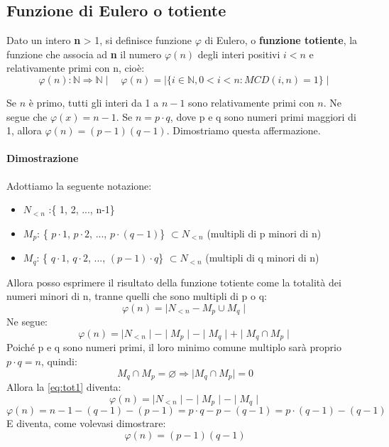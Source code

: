 \subsection{Funzione di Eulero o totiente}  

Dato un intero \textbf{n} > 1, si definisce funzione $\varphi$ di Eulero, o \textbf{funzione totiente}, la funzione che associa ad \textbf{n} il numero $\varphi (n)$ degli interi positivi $i < n$ e relativamente
primi con n, cioè:
\begin{equation}
\varphi (n): \mathbb{N} \Rightarrow \mathbb{N} \mid \quad \varphi (n) = \mid \{ i \in \mathbb{N}, 0 < i < n: MCD(i,n) = 1 \} \mid
\end{equation}

Se $n$ è primo, tutti gli interi da 1 a $n-1$ sono relativamente primi con $n$. Ne segue che $\varphi(x) = n - 1$. Se $n = p \cdot q$, dove p e q sono numeri primi maggiori di 1, allora $\varphi(n) = (p-1)(q-1)$. Dimostriamo questa affermazione.

\paragraph{Dimostrazione} Adottiamo la seguente notazione:
\begin{itemize}
\item $N_{<n}$ :\{ 1, 2, ..., n-1\}
\item $M_p$: \{ $p \cdot 1$, $p \cdot 2$, ..., $p \cdot (q-1)$\} $\subset N_{<n}$ (multipli di p minori di n)
\item $M_q$: \{ $q \cdot 1$, $q \cdot 2$, ..., $(p-1) \cdot q$\} $\subset N_{<n}$ (multipli di q minori di n)
\end{itemize}
Allora posso esprimere il risultato della funzione totiente come la totalità dei numeri minori di n, tranne quelli che sono multipli di p o q:
\begin{equation}
\varphi (n) = \mid N_{<n} - M_p \cup M_q \mid
\end{equation}
Ne segue:
\begin{equation} \label{eq:tot1}
\varphi (n) = \mid N_{<n} \mid - \mid M_p \mid - \mid M_q \mid + \mid M_q \cap M_p \mid
\end{equation}
Poiché p e q sono numeri primi, il loro minimo comune multiplo sarà proprio $p \cdot q = n$, quindi:
\begin{equation}
M_q \cap M_p = \varnothing \Rightarrow \mid M_q \cap M_p \mid = 0
\end{equation}
Allora la \ref{eq:tot1} diventa:
\begin{equation}
\varphi (n) = \mid N_{<n} \mid - \mid M_p \mid - \mid M_q \mid 
\end{equation}
\begin{equation}
\varphi (n) = n-1 - (q -1) - (p - 1) =  p \cdot q - p - (q - 1) =  p \cdot (q - 1) - (q - 1)
\end{equation}
E diventa, come volevasi dimostrare:
\begin{equation}
\varphi (n) = (p - 1)(q - 1)
\end{equation}


